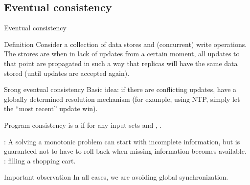\subsection{Eventual consistency}
\begin{slide}{Eventual consistency}
  \begin{block}{Definition}
    Consider a collection of data stores and (concurrent) write operations. The strores are  when in lack of updates from a certain moment, all updates to that point are propagated in
    such a way that replicas will have the same data stored (until updates are accepted again).
  \end{block}

  \begin{block}{Srong eventual consistency}
    Basic idea: if there are conflicting updates, have a globally determined resolution mechanism (for
    example, using NTP, simply let the ``most recent'' update win). 
  \end{block}

  \begin{block}{Program consistency}
     is a  if for any input sets  and ,
    .

    : A  solving a monotonic problem can start with incomplete information, but
    is guaranteed not to have to roll back when missing information becomes available. :
    filling a shopping cart.
  \end{block}
  \begin{alertblock}{Important observation}
    In all cases, we are avoiding global synchronization.
  \end{alertblock}
\end{slide}
